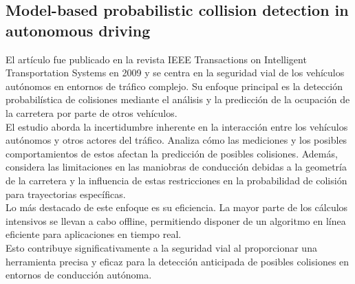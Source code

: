 \subsection{
    \textbf{Model-based probabilistic collision detection in autonomous driving}
    ~\cite{althoff2009model}
}\label{subsec:probabilistic-collision-detection}
El artículo fue publicado en la revista IEEE Transactions on Intelligent Transportation Systems en 2009 y se centra en la seguridad vial
de los vehículos autónomos en entornos de tráfico complejo.
Su enfoque principal es la detección probabilística de colisiones mediante el análisis y la predicción de la ocupación de la carretera
por parte de otros vehículos.\\
El estudio aborda la incertidumbre inherente en la interacción entre los vehículos autónomos y otros actores del tráfico.
Analiza cómo las mediciones y los posibles comportamientos de estos afectan la predicción de posibles colisiones.
Además, considera las limitaciones en las maniobras de conducción debidas a la geometría de la carretera y la influencia
de estas restricciones en la probabilidad de colisión para trayectorias específicas.\\
Lo más destacado de este enfoque es su eficiencia. La mayor parte de los cálculos intensivos se llevan a cabo offline,
permitiendo disponer de un algoritmo en línea eficiente para aplicaciones en tiempo real.                                                                           \\
Esto contribuye significativamente a la seguridad vial al proporcionar una herramienta precisa y eficaz para la detección anticipada de
posibles colisiones en entornos de conducción autónoma.                                                            \\
